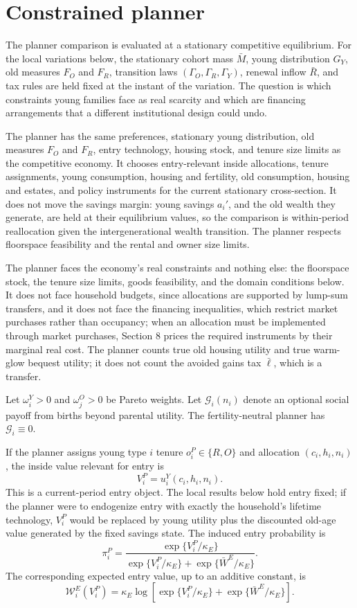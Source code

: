 \documentclass[11pt]{article}
\newcommand{\1}{\mathbf 1}
\begin{document}
\section{Constrained planner}

The planner comparison is evaluated at a stationary competitive equilibrium. For the local variations below, the stationary cohort mass $\bar M$, young distribution $G_Y$, old measures $F_O$ and $F_R$, transition laws $(\Gamma_O,\Gamma_R,\Gamma_Y)$, renewal inflow $\bar R$, and tax rules are held fixed at the instant of the variation. The question is which constraints young families face as real scarcity and which are financing arrangements that a different institutional design could undo.

The planner has the same preferences, stationary young distribution, old measures $F_O$ and $F_R$, entry technology, housing stock, and tenure size limits as the competitive economy. It chooses entry-relevant inside allocations, tenure assignments, young consumption, housing and fertility, old consumption, housing and estates, and policy instruments for the current stationary cross-section. It does not move the savings margin: young savings $a_i'$, and the old wealth they generate, are held at their equilibrium values, so the comparison is within-period reallocation given the intergenerational wealth transition. The planner respects floorspace feasibility and the rental and owner size limits.

The planner faces the economy's real constraints and nothing else: the floorspace stock, the tenure size limits, goods feasibility, and the domain conditions below. It does not face household budgets, since allocations are supported by lump-sum transfers, and it does not face the financing inequalities, which restrict market purchases rather than occupancy; when an allocation must be implemented through market purchases, Section 8 prices the required instruments by their marginal real cost. The planner counts true old housing utility and true warm-glow bequest utility; it does not count the avoided gains tax $\bar\ell$, which is a transfer.

Let $\omega_i^Y>0$ and $\omega_j^O>0$ be Pareto weights. Let $\mathcal G_i(n_i)$ denote an optional social payoff from births beyond parental utility. The fertility-neutral planner has $\mathcal G_i\equiv0$.

If the planner assigns young type $i$ tenure $o_i^P\in\{R,O\}$ and allocation $(c_i,h_i,n_i)$, the inside value relevant for entry is
\[
V_i^P=u_i^Y(c_i,h_i,n_i).
\]
This is a current-period entry object. The local results below hold entry fixed; if the planner were to endogenize entry with exactly the household's lifetime technology, $V_i^P$ would be replaced by young utility plus the discounted old-age value generated by the fixed savings state.
The induced entry probability is
\[
\pi_i^P
=
\frac{
\exp\{V_i^P/\kappa_E\}
}{
\exp\{V_i^P/\kappa_E\}
+
\exp\{\bar W^E/\kappa_E\}
}.
\]
The corresponding expected entry value, up to an additive constant, is
\[
\mathcal W_i^E(V_i^P)
=
\kappa_E
\log
\left[
\exp\{V_i^P/\kappa_E\}
+
\exp\{\bar W^E/\kappa_E\}
\right].
\]
\end{document}
